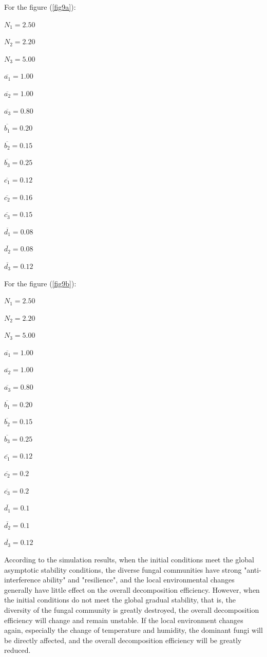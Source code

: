 For the figure (\ref{fig9a}):

\begin{multicols}{5}

    $N_{1}=2.50$

    $N_{2}=2.20$

    $N_{3}=5.00$

    $\overline{a_{1}}=1.00$

    $\overline{a_{2}}=1.00$

    $\overline{a_{3}}=0.80$

    $\overline{b_{1}}=0.20$

    $\overline{b_{2}}=0.15$

    $\overline{b_{3}}=0.25$

    $\overline{c_{1}}=0.12$

    $\overline{c_{2}}=0.16$

    $\overline{c_{3}}=0.15$

    $\overline{d_{1}}=0.08$

    $\overline{d_{2}}=0.08$

    $\overline{d_{3}}=0.12$ 

\end{multicols}

For the figure (\ref{fig9b}):

\begin{multicols}{5}

    $N_{1}=2.50$

    $N_{2}=2.20$

    $N_{3}=5.00$

    $\overline{a_{1}}=1.00$

    $\overline{a_{2}}=1.00$

    $\overline{a_{3}}=0.80$

    $\overline{b_{1}}=0.20$

    $\overline{b_{2}}=0.15$

    $\overline{b_{3}}=0.25$

    $\overline{c_{1}}=0.12$

    $\overline{c_{2}}=0.2$

    $\overline{c_{3}}=0.2$

    $\overline{d_{1}}=0.1$

    $\overline{d_{2}}=0.1$

    $\overline{d_{3}}=0.12$ 

\end{multicols}

According to the simulation results, when the initial conditions meet the global asymptotic stability conditions, the diverse fungal communities have strong "anti-interference ability" and "resilience", and the local environmental changes generally have little effect on the overall decomposition efficiency. However, when the initial conditions do not meet the global gradual stability, that is, the diversity of the fungal community is greatly destroyed, the overall decomposition efficiency will change and remain unstable. If the local environment changes again, especially the change of temperature and humidity, the dominant fungi will be directly affected, and the overall decomposition efficiency will be greatly reduced.
